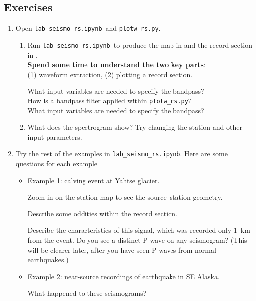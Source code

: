 \documentclass[11pt,titlepage,fleqn]{article}
\newcommand{\tfile}{{\tt lab\_seismo\_rs.ipynb}}
\begin{document}

\subsection*{Exercises}

\begin{enumerate}

\item Open \tfile\ and \verb+plotw_rs.py+.
%
\begin{enumerate}
\item Run \tfile\ to produce the map in  and the record section in . \\
{\bf Spend some time to understand the two key parts}: \\
(1) waveform extraction, (2) plotting a record section.

What input variables are needed to specify the bandpass? \\
How is a bandpass filter applied within \verb+plotw_rs.py+? \\
What input variables are needed to specify the bandpass?

\item What does the spectrogram show? Try changing the station and other input parameters.

\end{enumerate}


\item Try the rest of the examples in \tfile. Here are some questions for each example
%
\begin{itemize}
\item Example 1: calving event at Yahtse glacier. 

Zoom in on the station map to see the source--station geometry.

Describe some oddities within the record section.

Describe the characteristics of this signal, which was recorded only 1~km from the event. Do you see a distinct P wave on any seismogram? (This will be clearer later, after you have seen P waves from normal earthquakes.)

\item Example 2: near-source recordings of  earthquake in SE Alaska. 

What happened to these seismograms?


\end{itemize}
\end{enumerate}
\end{document}
